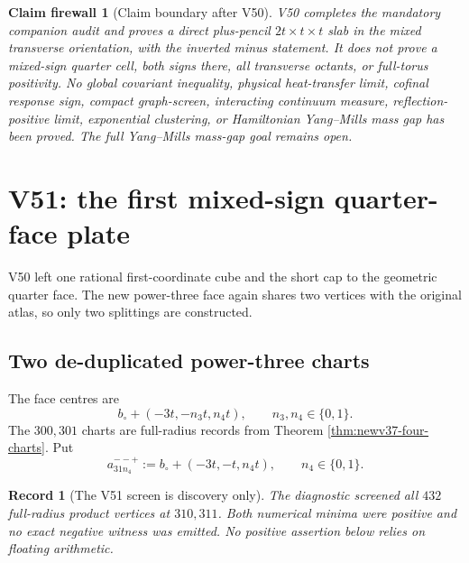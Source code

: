 \documentclass[11pt,oneside]{article}
\newtheorem{firewall}[theorem]{Claim firewall}
\newtheorem{record}[theorem]{Record}
\theoremstyle{definition}
\theoremstyle{remark}
\begin{document}
\begin{firewall}[Claim boundary after V50]
\label{fire:newv50-final}
V50 completes the mandatory companion audit and proves a direct
plus-pencil \(2t\times t\times t\) slab in the mixed transverse
orientation, with the inverted minus statement.  It does not prove
a mixed-sign quarter cell, both signs there, all transverse
octants, or full-torus positivity.  No global covariant inequality,
physical heat-transfer limit, cofinal response sign, compact
graph-screen, interacting continuum measure, reflection-positive
limit, exponential clustering, or Hamiltonian Yang--Mills mass gap
has been proved.  The full Yang--Mills mass-gap goal remains open.
\end{firewall}

\section{V51: the first mixed-sign quarter-face plate}
\label{sec:newv51-mixed-first-face}

V50 left one rational first-coordinate cube and the short cap to
the geometric quarter face.  The new power-three face again shares
two vertices with the original atlas, so only two splittings are
constructed.

\subsection{Two de-duplicated power-three charts}

The face centres are
\[
 b_\circ+(-3t,-n_3t,n_4t),\qquad n_3,n_4\in\{0,1\}.   \tag{51.1}
\]
The \(300,301\) charts are full-radius records from Theorem
\ref{thm:newv37-four-charts}.  Put
\[
 a_{31n_4}^{--+}:=b_\circ+(-3t,-t,n_4t),
 \qquad n_4\in\{0,1\}.                                \tag{51.2}
\]

\begin{record}[The V51 screen is discovery only]
\label{rec:newv51-screen}
The diagnostic screened all \(432\) full-radius product vertices
at \(310,311\).  Both numerical minima were positive and no exact
negative witness was emitted.  No positive assertion below relies
on floating arithmetic.
\end{record}
\end{document}

